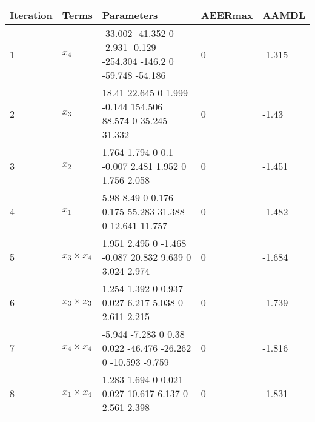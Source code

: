 \begin{tabular}{lllll}
Iteration & Terms & Parameters & AEERmax & AAMDL \\ 
\hline 
1 & $x_4$ & -33.002       -41.352             0        -2.931        -0.129      -254.304        -146.2             0       -59.748       -54.186 & 0 & -1.315 \\ 
2 & $x_3$ & 18.41        22.645             0         1.999        -0.144       154.506        88.574             0        35.245        31.332 & 0 & -1.43 \\ 
3 & $x_2$ & 1.764       1.794           0         0.1      -0.007       2.481       1.952           0       1.756       2.058 & 0 & -1.451 \\ 
4 & $x_1$ & 5.98         8.49            0        0.176        0.175       55.283       31.388            0       12.641       11.757 & 0 & -1.482 \\ 
5 & $x_3 \times x_4$ & 1.951        2.495            0       -1.468       -0.087       20.832        9.639            0        3.024        2.974 & 0 & -1.684 \\ 
6 & $x_3 \times x_3$ & 1.254       1.392           0       0.937       0.027       6.217       5.038           0       2.611       2.215 & 0 & -1.739 \\ 
7 & $x_4 \times x_4$ & -5.944       -7.283            0         0.38        0.022      -46.476      -26.262            0      -10.593       -9.759 & 0 & -1.816 \\ 
8 & $x_1 \times x_4$ & 1.283        1.694            0        0.021        0.027       10.617        6.137            0        2.561        2.398 & 0 & -1.831 \\ 
\hline 
\end{tabular}